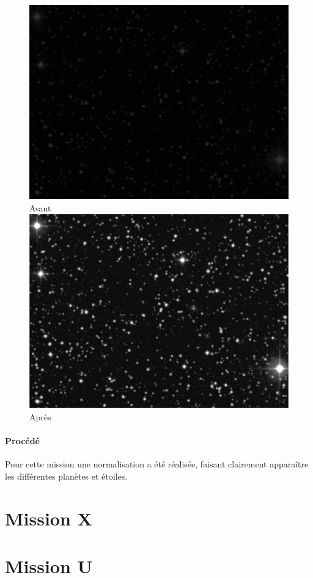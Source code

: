 \documentclass[12pt]{article}
\begin{document}
	\begin{figure}[h]
	\centering
		\begin{multicols}{2}
		\includegraphics[scale=0.525]{images/GD61.png}
		Avant
		\includegraphics[scale=0.525]{images/GD61AFTER.png}
		Après
		\end{multicols}
	\end{figure}
	\vspace{-0.9cm}

		\paragraph{Procédé}	
			Pour cette mission une normalisation a été réalisée, faisant clairement apparaître les différentes planètes et étoiles.
		\par

\section{Mission X}

\section{Mission U}
\end{document}
